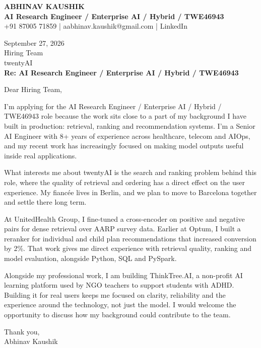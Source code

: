 \documentclass[10pt,a4paper]{article}
\begin{document}
\begin{center}
{\Large\bfseries ABHINAV KAUSHIK}\\[2pt]
{\bfseries AI Research Engineer / Enterprise AI / Hybrid / TWE46943}\\[2pt]
+91 87005 71859 \quad | \quad aabhinav.kaushik@gmail.com \quad | \quad LinkedIn
\end{center}
\vspace{8pt}
September 27, 2026\\[6pt]
Hiring Team\\
twentyAI\\[4pt]
\textbf{Re: AI Research Engineer / Enterprise AI / Hybrid / TWE46943}

Dear Hiring Team,

I’m applying for the AI Research Engineer / Enterprise AI / Hybrid / TWE46943 role because the work sits close to a part of my background I have built in production: retrieval, ranking and recommendation systems. I’m a Senior AI Engineer with 8+ years of experience across healthcare, telecom and AIOps, and my recent work has increasingly focused on making model outputs useful inside real applications.

What interests me about twentyAI is the search and ranking problem behind this role, where the quality of retrieval and ordering has a direct effect on the user experience. My fiancée lives in Berlin, and we plan to move to Barcelona together and settle there long term.

At UnitedHealth Group, I fine-tuned a cross-encoder on positive and negative pairs for dense retrieval over AARP survey data. Earlier at Optum, I built a reranker for individual and child plan recommendations that increased conversion by 2\%. That work gives me direct experience with retrieval quality, ranking and model evaluation, alongside Python, SQL and PySpark.

Alongside my professional work, I am building ThinkTree.AI, a non-profit AI learning platform used by NGO teachers to support students with ADHD. Building it for real users keeps me focused on clarity, reliability and the experience around the technology, not just the model. I would welcome the opportunity to discuss how my background could contribute to the team.

Thank you,\\
Abhinav Kaushik
\end{document}

